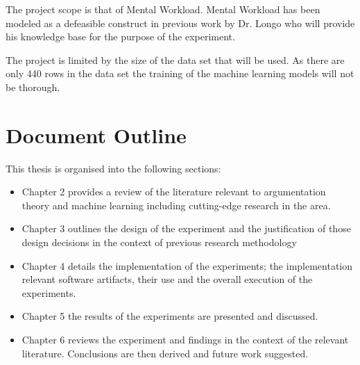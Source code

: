 The project scope is that of Mental Workload. Mental Workload has been modeled as a defeasible construct in previous work by Dr. Longo who will provide his knowledge base for the purpose of the experiment. 

The project is limited by the size of the data set that will be used. As there are only 440 rows in the data set the training of the machine learning models will not be thorough. 

\section{Document Outline}

This thesis is organised into the following sections:

\begin{itemize}

  \item Chapter 2 provides a review of the literature relevant to argumentation theory and machine learning including cutting-edge research in the area.
  \item Chapter 3 outlines the design of the experiment and the justification of those design decisions in the context of previous research methodology
  \item Chapter 4 details the implementation of the experiments; the implementation relevant software artifacts, their use and the overall execution of the experiments.
  \item Chapter 5 the results of the experiments are presented and discussed.
  \item Chapter 6 reviews the experiment and findings in the context of the relevant literature. Conclusions are then derived and future work suggested.

\end{itemize}
